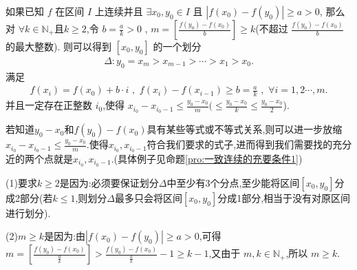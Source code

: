 \documentclass[lang=cn,newtx,10pt,scheme=chinese]{elegantbook}
\begin{document}
\begin{proposition}\label{pro:连续函数在固定的两点之间寻找充分近的两点,同时保持两点函数值之差足够大}
    如果已知 \(f\) 在区间 \(I\) 上连续并且 \(\exists x_0,y_0\in I\) 且 \(\left| f\left( x_0 \right) -f\left( y_0 \right) \right|\geq a>0\),
    那么对 \(\forall k\in \mathbb{N} _+\)且$k\ge2$,令 \(b = \frac{a}{k}>0\)\,\,,\,\,\(m=\left[ \frac{f\left( y_0 \right) -f\left( x_0 \right)}{b} \right]\geq k\)(不超过 \(\frac{f\left( y_0 \right) -f\left( x_0 \right)}{b}\) 的最大整数).
则可以得到 \(\left[ x_0,y_0 \right]\) 的一个划分 
\begin{align*}
\Delta :y_0=x_m>x_{m - 1}>\cdots >x_1>x_0.
\end{align*}
满足 \begin{align*}
    f\left( x_i \right) = f\left( x_0 \right) + b\cdot i\,\,,\,\,f\left( x_i \right) - f\left( x_{i - 1} \right) \geq b=\frac{a}{k}\,\,,\,\,\forall i = 1,2\cdots,m.
\end{align*}
并且一定存在正整数 \(i_0\),使得 \(x_{i_0}-x_{i_0 - 1}\leq \frac{y_0 - x_0}{m}(\leq \frac{y_0 - x_0}{k}\leq \frac{y_0 - x_0}{2}\)).
\end{proposition}
\begin{remark}
    若知道$y_0-x_0$和$f(y_0)-f(x_0)$具有某些等式或不等式关系,则可以进一步放缩\(x_{i_0}-x_{i_0 - 1}\leq \frac{y_0 - x_0}{m}\).使得$x_{i_0},x_{i_0 - 1}$符合我们要求的式子,进而得到我们需要找的充分近的两个点就是$x_{i_0},x_{i_0 - 1}$.(具体例子见命题\ref{pro:一致连续的充要条件1})
\end{remark}
\begin{note}
   (1)要求$k\ge2$是因为:必须要保证划分$\Delta$中至少有3个分点,至少能将区间$[x_0,y_0]$分成2部分(若$k\le1$,则划分$\Delta$最多只会将区间$[x_0,y_0]$分成1部分,相当于没有对原区间进行划分).

   (2)$m\geq k$是因为:由\(\left| f\left( x_0 \right) -f\left( y_0 \right) \right|\geq a>0\),可得\(m=\left[ \frac{f\left( y_0 \right) -f\left( x_0 \right)}{\frac{a}{k}} \right] >\frac{f\left( y_0 \right) -f\left( x_0 \right)}{\frac{a}{k}} - 1\geq k - 1\),又由于 \(m,k\in \mathbb{N} _+\),所以 \(m\geq k\).
\end{note} 
\end{document}
